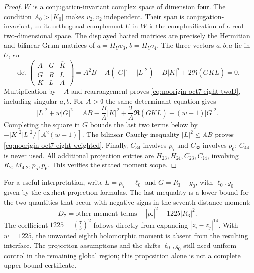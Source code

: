 \documentclass[11pt]{article}
\theoremstyle{remark}
\numberwithin{equation}{section}
\begin{document}
\begin{proof}
$W$ is a conjugation-invariant complex space of dimension four.
The condition $A_0>|K_0|$ makes $v_2,\overline v_2$ independent.
Their span is conjugation-invariant, so its orthogonal complement
$U$ in $W$ is the complexification of a real two-dimensional space.
The displayed hatted matrices are precisely the Hermitian and
bilinear Gram matrices of $a=\Pi_Uv_3$, $b=\Pi_Uv_4$.
The three vectors $a,b,\overline a$ lie in $U$, so
\[
 \det\begin{pmatrix}
 A&G&\overline K\\\overline G&B&\overline L\\K&L&A
 \end{pmatrix}
 =A^2B-A(|G|^2+|L|^2)-B|K|^2
                 +2\Re(GK\overline L)=0.
\]
Multiplication by $-A$ and rearrangement proves
\eqref{eq:noorigin-oct7-eight-twoD}, including singular $a,b$.
For $A>0$ the same determinant equation gives
\[
 |L|^2+w|G|^2
 =AB-\frac BA|K|^2+\frac2A\Re(GK\overline L)
                                      +(w-1)|G|^2.
\]
Completing the square in $G$ bounds the last two terms below by
$-|K|^2|L|^2/[A^2(w-1)]$. The bilinear Cauchy inequality
$|L|^2\le AB$ proves \eqref{eq:noorigin-oct7-eight-weighted}.
Finally, $C_{34}$ involves $p_7$ and $C_{33}$ involves $p_6$;
$C_{44}$ is never used. All additional projection entries are
$H_{23},H_{24},C_{23},C_{24}$, involving $R_2,M_{4,2},p_5,p_6$.
This verifies the stated moment scope.
\end{proof}

For a useful interpretation, write $L=p_7-\ell_0$ and
$G=R_3-g_0$, with $\ell_0,g_0$ given by the explicit projection
formulas. The last inequality is a lower bound for the two quantities
that occur with negative signs in the seventh distance moment:
\[
              D_7=\text{other moment terms}
                              -|p_7|^2-1225|R_3|^2.
\]
The coefficient $1225=\binom73^2$ follows directly from expanding
$|z_i-z_j|^{14}$. With $w=1225$, the unwanted eighth holomorphic
moment is absent from the resulting interface.
The projection assumptions and the shifts $\ell_0,g_0$ still need
uniform control in the remaining global region; this proposition
alone is not a complete upper-bound certificate.
\end{document}
